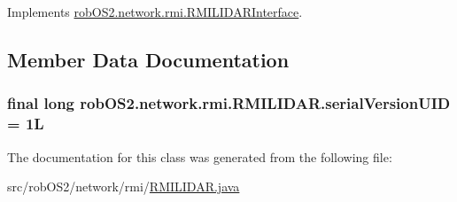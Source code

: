 Implements \hyperlink{interfacerob_o_s2_1_1network_1_1rmi_1_1_r_m_i_l_i_d_a_r_interface_a3c08c8a5051ab464e7ba4571409f7084}{robOS2.network.rmi.RMILIDARInterface}.



\subsection{Member Data Documentation}
\hypertarget{classrob_o_s2_1_1network_1_1rmi_1_1_r_m_i_l_i_d_a_r_ad268aaca2d2a77ac9341792f57706804}{
\subsubsection[{serialVersionUID}]{\setlength{\rightskip}{0pt plus 5cm}final long {\bf robOS2.network.rmi.RMILIDAR.serialVersionUID} = 1L}}
\label{classrob_o_s2_1_1network_1_1rmi_1_1_r_m_i_l_i_d_a_r_ad268aaca2d2a77ac9341792f57706804}


The documentation for this class was generated from the following file:\begin{DoxyCompactItemize}
\item 
src/robOS2/network/rmi/\hyperlink{_r_m_i_l_i_d_a_r_8java}{RMILIDAR.java}\end{DoxyCompactItemize}

